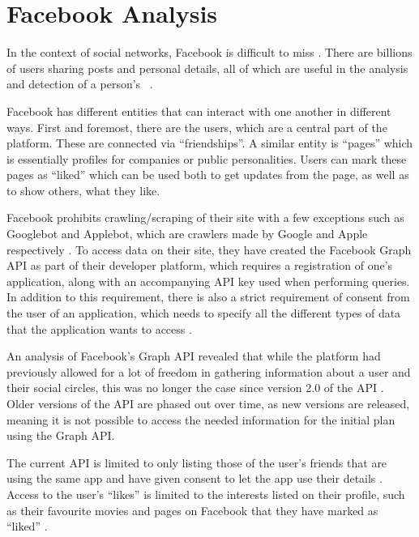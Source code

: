 \section{Facebook Analysis}\label{sec:facebook-analysis}
In the context of social networks, Facebook is difficult to miss
\citep{FacebookPopularity}.
There are billions of users sharing posts and personal details, all of which are
useful in the analysis and detection of a person's \fb\ .\nl

Facebook has different entities that can interact with one another in different ways.
First and foremost, there are the users, which are a central part of the
platform. These are connected via ``friendships''.
A similar entity is ``pages'' which is essentially profiles for companies or
public personalities.
Users can mark these pages as ``liked'' which can be used both to get updates
from the page, as well as to show others, what they like.\nl

Facebook prohibits crawling/scraping of their site with a few exceptions such as
Googlebot and Applebot, which are crawlers made by Google and Apple
respectively \citep{FacebookRobotsTxt}.
To access data on their site, they have created the Facebook Graph \ac{API} as part
of their developer platform, which requires a registration of one's application,
along with an accompanying \ac{API} key used when performing queries.
In addition to this requirement, there is also a strict requirement of consent
from the user of an application, which needs to specify all the different types
of data that the application wants to access \citep{FacebookGraphApiAccessTokens}.\nl

An analysis of Facebook's Graph \ac{API} \citep{FacebookGraphApiDocumentation} revealed that while the platform had
previously allowed for a lot of freedom in gathering information about a user
and their social circles, this was no longer the case since version 2.0 of the
API \citep{FacebookChangesInGraphTwoPointOh}.
Older versions of the \ac{API} are phased out over time, as new versions are released, meaning it is not possible to access
the needed information for the initial plan using the Graph
API.\nl

The current \ac{API} is limited to only listing those of the user's friends that are using the same app and have given
consent to let the app use their details \citep{FacebookChangesInGraphTwoPointOh}.
Access to the user's ``likes'' is limited to the interests listed on their profile, such as their favourite movies and
pages on Facebook that they have marked as ``liked''
\citep{FacebookGraphApiUserLikes} \citep{FacebookGraphApiUserEdges}.\nl

